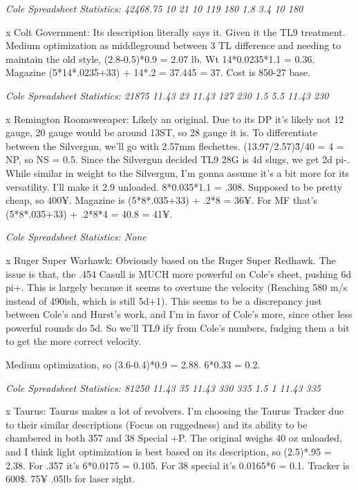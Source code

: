 \begin{multicols*}{2}
	\textit{\textcolor{OliveGreen}{Cole Spreadsheet Statistics: 42468.75 10 21 10 119 180 1.8 3.4 10 180}}
	
	x Colt Government: Its description literally says it. Given it the TL9 treatment. Medium optimization as middleground between 3 TL difference and needing to maintain the old style, (2.8-0.5)*0.9 = 2.07 lb. Wt 14*0.0235*1.1 = 0.36. Magazine (5*14*.0235+33) + 14*.2 = 37.445 = 37. Cost is 850-27 base.
	
	\textit{\textcolor{OliveGreen}{Cole Spreadsheet Statistics: 21875 11.43 23 11.43 127 230 1.5 5.5 11.43 230}}
	
	x Remington Roomsweeaper: Likely an original. Due to its DP it's likely not 12 gauge, 20 gauge would be around 13ST, so 28 gauge it is. To differentiate between the Silvergun, we'll go with 2.57mm flechettes. (13.97/2.57)\^3/40 = 4 = NP, so NS = 0.5. Since the Silvergun decided TL9 28G is 4d slugs, we get 2d pi-. While similar in weight to the Silvergun, I'm gonna assume it's a bit more for its versatility. I'll make it 2.9 unloaded. 8*0.035*1.1 = .308. Supposed to be pretty cheap, so 400¥. Magazine is (5*8*.035+33) + .2*8 = 36¥. For MF that's (5*8*.035+33) + .2*8*4 = 40.8 = 41¥.
	
	\textit{\textcolor{OliveGreen}{Cole Spreadsheet Statistics: None}}
	
	x Ruger Super Warhawk: Obviously based on the Ruger Super Redhawk. The issue is that, the .454 Casull is MUCH more powerful on Cole's sheet, pushing 6d pi+. This is largely because it seems to overtune the velocity (Reaching 580 m/s instead of 490ish, which is still 5d+1). This seems to be a discrepancy just between Cole's and Hurst's work, and I'm in favor of Cole's more, since other less powerful rounds do 5d. So we'll TL9 ify from Cole's numbers, fudging them a bit to get the more correct velocity.
	
	Medium optimization, so (3.6-0.4)*0.9 = 2.88. 6*0.33 = 0.2. 
	
	\textit{\textcolor{OliveGreen}{Cole Spreadsheet Statistics: 81250 11.43 35 11.43 330 335 1.5 1 11.43 335}}
	
	x Taurus: Taurus makes a lot of revolvers. I'm choosing the Taurus Tracker due to their similar descriptions (Focus on ruggedness) and its ability to be chambered in both 357 and 38 Special +P. The original weighs 40 oz unloaded, and I think light optimization is best based on its description, so (2.5)*.95 = 2.38. For .357 it's 6*0.0175 = 0.105. For 38 special it's 0.0165*6 = 0.1. Tracker is 600\$. 75¥ .05lb for laser sight.
	

\end{multicols*}
